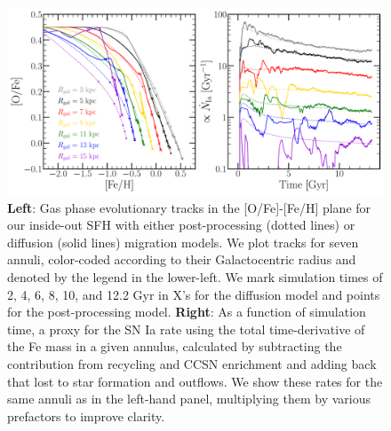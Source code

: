 \documentclass[fleqn, usenatbib]{mnras}
\begin{document}
\begin{figure} 
\centering 
\includegraphics[scale = 0.42]{tracks.pdf} 
\caption{\textbf{Left}: Gas phase evolutionary tracks in the [O/Fe]-[Fe/H] 
plane for our inside-out SFH with either post-processing (dotted lines) or 
diffusion (solid lines) migration models. We plot tracks for seven annuli, 
color-coded according to their Galactocentric radius and denoted by the legend 
in the lower-left. We mark simulation times of 2, 4, 6, 8, 10, and 12.2 Gyr in 
X's for the diffusion model and points for the post-processing model. 
\textbf{Right}: As a function of simulation time, a proxy for the SN Ia rate 
using the total time-derivative of the Fe mass in a given annulus, calculated 
by subtracting the contribution from recycling and CCSN enrichment and adding 
back that lost to star formation and outflows. We show these rates for the 
same annuli as in the left-hand panel, multiplying them by various prefactors 
to improve clarity. } 
\label{fig:tracks} 
\end{figure} 
\end{document}
